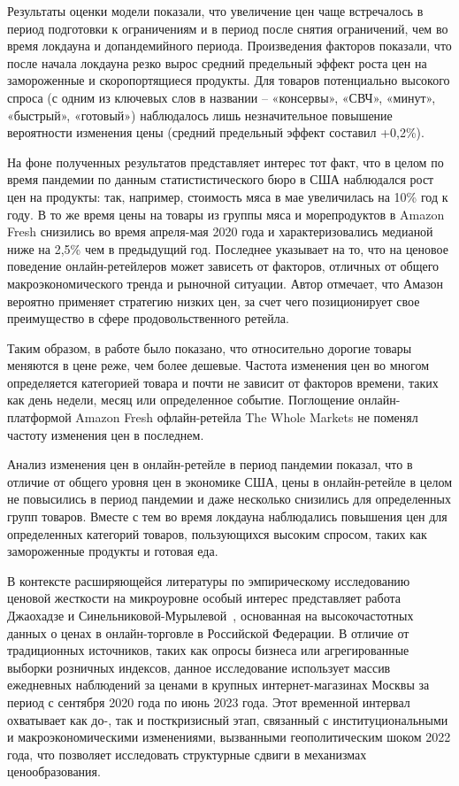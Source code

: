 Результаты оценки модели показали, что увеличение цен чаще встречалось в период подготовки к ограничениям и в период после снятия ограничений, чем во время локдауна и допандемийного периода. Произведения факторов показали, что после начала локдауна резко вырос средний предельный эффект роста цен на замороженные и скоропортящиеся продукты. Для товаров потенциально высокого спроса (с одним из ключевых слов в названии – «консервы», «СВЧ», «минут», «быстрый», «готовый») наблюдалось лишь незначительное повышение вероятности изменения цены (средний предельный эффект составил +0,2\%).

На фоне полученных результатов представляет интерес тот факт, что в целом по время пандемии по данным статистистического бюро в США наблюдался рост цен на продукты: так, например, стоимость мяса в мае увеличилась на 10\% год к году. В то же время цены на товары из группы мяса и морепродуктов в Amazon Fresh снизились во время апреля-мая 2020 года и характеризовались медианой ниже на 2,5\% чем в предыдущий год. Последнее указывает на то, что на ценовое поведение онлайн-ретейлеров может зависеть от факторов, отличных от общего макроэкономического тренда и рыночной ситуации. Автор отмечает, что Амазон вероятно применяет стратегию низких цен, за счет чего позиционирует свое преимущество в сфере продовольственного ретейла.


Таким образом, в работе \cite{HILLEN202163} было показано, что относительно дорогие товары меняются в цене реже, чем более дешевые. Частота изменения цен во многом определяется категорией товара и почти не зависит от факторов времени, таких как день недели, месяц или определенное событие. Поглощение онлайн-платформой Amazon Fresh офлайн-ретейла The Whole Markets не поменял частоту изменения цен в последнем.

Анализ изменения цен в онлайн-ретейле в период пандемии \cite{hillen2021covid} показал, что в отличие от общего уровня цен в экономике США, цены в онлайн-ретейле в целом не повысились в период пандемии и даже несколько снизились для определенных групп товаров. Вместе с тем во время локдауна наблюдались повышения цен для определенных категорий товаров, пользующихся высоким спросом, таких как замороженные продукты и готовая еда.

В контексте расширяющейся литературы по эмпирическому исследованию ценовой жесткости на микроуровне особый интерес представляет работа Джаохадзе и Синельниковой-Мурылевой~\cite{джоахадзе2024}, основанная на высокочастотных данных о ценах в онлайн-торговле в Российской Федерации. В отличие от традиционных источников, таких как опросы бизнеса или агрегированные выборки розничных индексов, данное исследование использует массив ежедневных наблюдений за ценами в крупных интернет-магазинах Москвы за период с сентября 2020 года по июнь 2023 года. Этот временной интервал охватывает как до-, так и посткризисный этап, связанный с институциональными и макроэкономическими изменениями, вызванными геополитическим шоком 2022 года, что позволяет исследовать структурные сдвиги в механизмах ценообразования.

